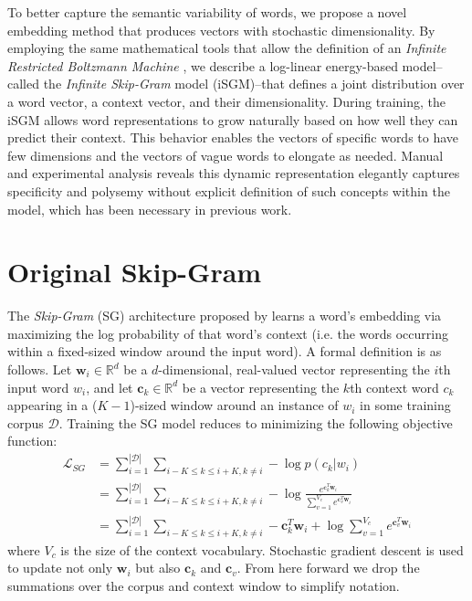 \documentclass{article} %
\begin{document}
To better capture the semantic variability of words, we propose a novel embedding method that produces vectors with stochastic dimensionality.  By employing the same mathematical tools that allow the definition of an \textit{Infinite Restricted Boltzmann Machine} \citep{cote2015infinite}, we describe a log-linear energy-based model--called the \textit{Infinite Skip-Gram} model (iSGM)--that defines a joint distribution over a word vector, a context vector, and their dimensionality.  During training, the iSGM allows word representations to grow naturally based on how well they can predict their context.  This behavior enables the vectors of specific words to have few dimensions and the vectors of vague words to elongate as needed.  Manual and experimental analysis reveals this dynamic representation elegantly captures specificity and polysemy without explicit definition of such concepts within the model, which has been necessary in previous work.

\section{Original Skip-Gram}
The \textit{Skip-Gram} (SG) architecture proposed by \cite{mikolov2013distributed} learns a word's embedding via maximizing the log probability of that word's context (i.e. the words occurring within a fixed-sized window around the input word).  A formal definition is as follows.  Let $\mathbf{w}_{i} \in \mathbb{R}^{d}$ be a $d$-dimensional, real-valued vector representing the $i$th input word $w_{i}$, and let $\mathbf{c}_{k} \in \mathbb{R}^{d}$ be a vector representing the $k$th context word $c_{k}$ appearing in a ($K-1$)-sized window around an instance of $w_{i}$ in some training corpus $\mathcal{D}$.  Training the SG model reduces to minimizing the following objective function: \begin{equation}\begin{split}\label{sg_def} \mathcal{L}_{SG} &= \sum_{i=1}^{|\mathcal{D}|} \sum_{i-K\le k \le i+K, k\ne i} - \log p(c_{k} | w_{i}) \\ &= \sum_{i=1}^{|\mathcal{D}|} \sum_{i-K\le k \le i+K, k\ne i} - \log \frac{e^{\mathbf{c}_{k}^{T}\mathbf{w}_{i}}}{\sum_{v=1}^{V_{c}} e^{\mathbf{c}_{v}^{T}\mathbf{w}_{i}}} \\ &= \sum_{i=1}^{|\mathcal{D}|} \sum_{i-K\le k \le i+K, k\ne i} - \mathbf{c}_{k}^{T}\mathbf{w}_{i} + \log \sum_{v=1}^{V_{c}} e^{\mathbf{c}_{v}^{T}\mathbf{w}_{i}} \end{split}\end{equation} where $V_{c}$ is the size of the context vocabulary.  Stochastic gradient descent is used to update not only $\mathbf{w}_{i}$ but also $\mathbf{c}_{k}$ and $\mathbf{c}_{v}$.  From here forward we drop the summations over the corpus and context window to simplify notation.
\end{document}
